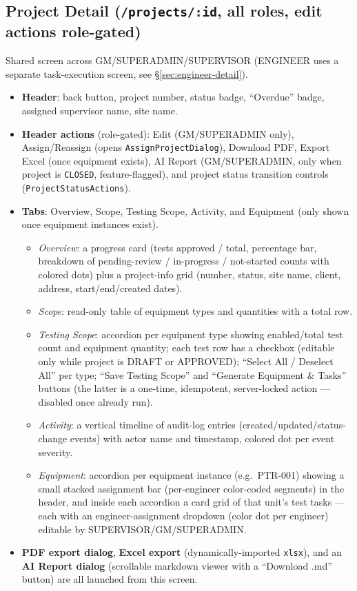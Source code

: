 \documentclass[11pt]{article}
\begin{document}
\subsection{Project Detail (\texttt{/projects/:id}, all roles, edit actions role-gated)}
Shared screen across GM/SUPERADMIN/SUPERVISOR (ENGINEER uses a separate task-execution screen, see
\S\ref{sec:engineer-detail}).
\begin{itemize}[nosep]
  \item \textbf{Header}: back button, project number, status badge, ``Overdue'' badge, assigned
    supervisor name, site name.
  \item \textbf{Header actions} (role-gated): Edit (GM/SUPERADMIN only), Assign/Reassign
    (opens \texttt{AssignProjectDialog}), Download PDF, Export Excel (once equipment exists),
    AI Report (GM/SUPERADMIN, only when project is \texttt{CLOSED}, feature-flagged), and
    project status transition controls (\texttt{ProjectStatusActions}).
  \item \textbf{Tabs}: Overview, Scope, Testing Scope, Activity, and Equipment (only shown once
    equipment instances exist).
  \begin{itemize}[nosep]
    \item \emph{Overview}: a progress card (tests approved / total, percentage bar, breakdown of
      pending-review / in-progress / not-started counts with colored dots) plus a project-info
      grid (number, status, site name, client, address, start/end/created dates).
    \item \emph{Scope}: read-only table of equipment types and quantities with a total row.
    \item \emph{Testing Scope}: accordion per equipment type showing enabled/total test count and
      equipment quantity; each test row has a checkbox (editable only while project is DRAFT or
      APPROVED); ``Select All / Deselect All'' per type; ``Save Testing Scope'' and
      ``Generate Equipment \& Tasks'' buttons (the latter is a one-time, idempotent, server-locked
      action --- disabled once already run).
    \item \emph{Activity}: a vertical timeline of audit-log entries (created/updated/status-change
      events) with actor name and timestamp, colored dot per event severity.
    \item \emph{Equipment}: accordion per equipment instance (e.g.\ PTR-001) showing a small
      stacked assignment bar (per-engineer color-coded segments) in the header, and inside each
      accordion a card grid of that unit's test tasks --- each with an engineer-assignment
      dropdown (color dot per engineer) editable by SUPERVISOR/GM/SUPERADMIN.
  \end{itemize}
  \item \textbf{PDF export dialog}, \textbf{Excel export} (dynamically-imported \texttt{xlsx}),
    and an \textbf{AI Report dialog} (scrollable markdown viewer with a ``Download .md'' button)
    are all launched from this screen.
\end{itemize}
\end{document}
